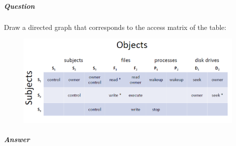 \documentclass{article}
\begin{document}
                        \subparagraph{Question}
                        Draw a directed graph that corresponds to
                        the access matrix of the table:
                        \begin{figure}[h]
                            \begin{center}
                                \includegraphics[scale=0.6]{../immagini/exaclb.png}
                            \end{center}
                            
                        \end{figure}
                        \subparagraph{Answer}
                            


\end{document}
